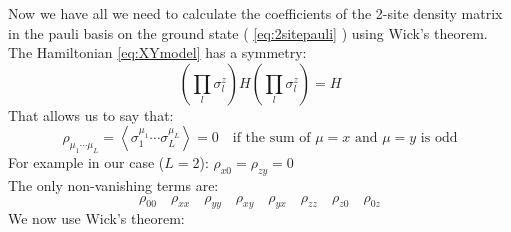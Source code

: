 \documentclass[12pt,a4paper]{book}
\theoremstyle{definition}
\begin{document}
Now we have all we need to calculate  the coefficients of the 2-site density matrix in the pauli basis on the ground state ( \ref{eq:2sitepauli} ) using Wick's theorem.\\
The Hamiltonian \ref{eq:XYmodel} has a symmetry:
\begin{equation}\label{eq:symm}\left(\prod_{l} \sigma_{l}^{z}\right) H\left(\prod_{l} \sigma_{l}^{z}\right)=H\end{equation}
That allows us to say that:
\begin{equation}\rho_{\mu_{1}\cdots  \mu_{L}}=\left\langle\sigma_{1}^{\mu_{1}}\cdots  \sigma_{L}^{\mu_{L}}\right\rangle=0 \quad \text{if the sum of $\mu=x$ and $\mu=y$ is odd}\end{equation}
For example in our case ($L=2$): $\rho_{x0}=\rho_{zy}=0$ \\
The only non-vanishing terms are:
\begin{equation}
	\rho_{00}\quad \rho_{xx} \quad \rho_{yy} \quad \rho_{xy} \quad \rho_{yx} \quad \rho_{zz}
	\quad \rho_{z0} \quad \rho_{0z}
\end{equation}
We now use Wick's theorem:
\end{document}
